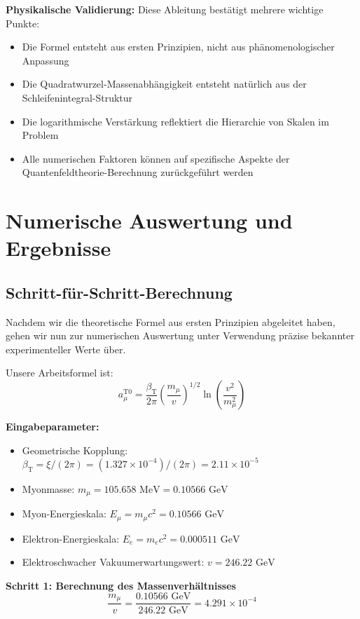 \documentclass[12pt,a4paper]{article}
\newcommand{\betaT}{\beta_{\text{T}}}
\newcommand{\xigeom}{\xi}
\newcommand{\Ee}{E_e}
\newcommand{\Emu}{E_{\mu}}
\begin{document}
\textbf{Physikalische Validierung:} Diese Ableitung bestätigt mehrere wichtige Punkte:
\begin{itemize}
\item Die Formel entsteht aus ersten Prinzipien, nicht aus phänomenologischer Anpassung
\item Die Quadratwurzel-Massenabhängigkeit entsteht natürlich aus der Schleifenintegral-Struktur
\item Die logarithmische Verstärkung reflektiert die Hierarchie von Skalen im Problem
\item Alle numerischen Faktoren können auf spezifische Aspekte der Quantenfeldtheorie-Berechnung zurückgeführt werden
\end{itemize}

\section{Numerische Auswertung und Ergebnisse}

\subsection{Schritt-für-Schritt-Berechnung}

Nachdem wir die theoretische Formel aus ersten Prinzipien abgeleitet haben, gehen wir nun zur numerischen Auswertung unter Verwendung präzise bekannter experimenteller Werte über.

Unsere Arbeitsformel ist:
\begin{equation}
a_\mu^{\text{T0}} = \frac{\betaT}{2\pi} \left(\frac{m_\mu}{v}\right)^{1/2} \ln\left(\frac{v^2}{m_\mu^2}\right)
\end{equation}

\textbf{Eingabeparameter:}
\begin{itemize}
\item Geometrische Kopplung: $\betaT = \xigeom/(2\pi) = (1.327 \times 10^{-4})/(2\pi) = 2.11 \times 10^{-5}$
\item Myonmasse: $m_\mu = 105.658 \text{ MeV} = 0.10566 \text{ GeV}$
\item Myon-Energieskala: $\Emu = m_\mu c^2 = 0.10566 \text{ GeV}$
\item Elektron-Energieskala: $\Ee = m_e c^2 = 0.000511 \text{ GeV}$
\item Elektroschwacher Vakuumerwartungswert: $v = 246.22 \text{ GeV}$
\end{itemize}

\textbf{Schritt 1: Berechnung des Massenverhältnisses}
\begin{equation}
\frac{m_\mu}{v} = \frac{0.10566 \text{ GeV}}{246.22 \text{ GeV}} = 4.291 \times 10^{-4}
\end{equation}
\end{document}
